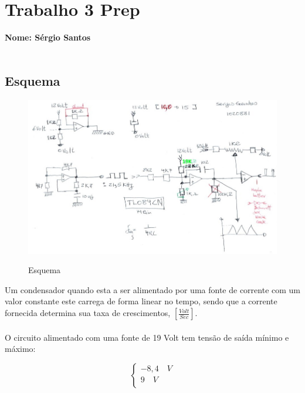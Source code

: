 \documentclass[titlepage, a4paper, 10pt, reqno, openany]{report}
\begin{document}
\renewcommand\thesection{\arabic{section}}
\renewcommand\thesubsection{\thesection.\arabic{subsection}}
\renewcommand\thesubsubsection{\thesection.\thesubsection.\arabic{subsubsection}}
\pagestyle{plain}%
\chapter*{Trabalho 3 Prep}
{\bf Nome: Sérgio Santos} \\
\hspace*{0.51cm}{\bf nº: 1020881}\\
\section{Esquema}
\begin{figure}[H]
	\centering
	\includegraphics[scale=0.6]{./image/esquema.jpg}\\
	\caption{Esquema}
\end{figure}
Um condensador quando esta a ser alimentado por uma fonte de corrente com um valor constante este carrega de forma linear no tempo, sendo que a corrente fornecida determina sua taxa de crescimentos, $\left[ \frac{Volt}{Sec} \right]$.\\ \\
O circuito alimentado com uma fonte de 19 Volt tem tensão de saída mínimo e máximo: \\
\begin{minipage}[l]{0pt}
	$$\left\lbrace\begin{array}{c}
 	-8,4 \quad V \\
 	9 \quad V \\
 \end{array}\right.$$
\end{minipage}
\end{document}
